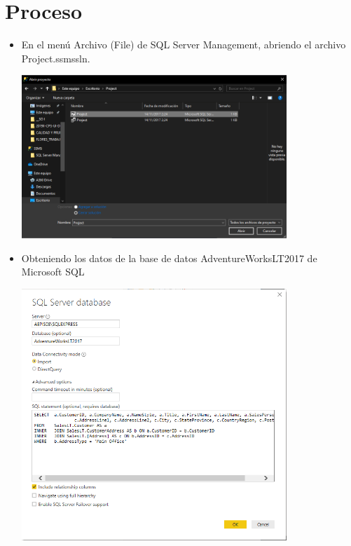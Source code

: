 \section{Proceso} 

\begin{itemize}
	\item En el menú Archivo (File) de SQL Server Management,  abriendo el archivo Project.ssmssln.
	\begin{center}
	\includegraphics[width=10cm]{./Imagenes/Captura} 
	\end{center}
\end{itemize} 

\begin{itemize}
	\item Obteniendo los datos de la base de datos AdventureWorksLT2017 de Microsoft SQL
	\begin{center}
	\includegraphics[width=10cm]{./Imagenes/Captura2} 
	\end{center}
\end{itemize} 

